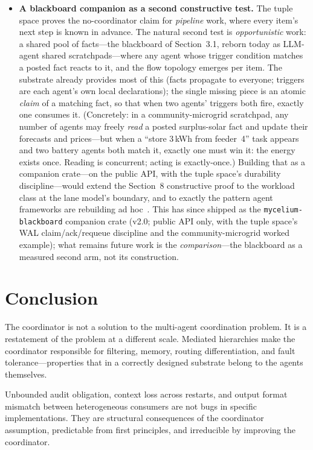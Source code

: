 \documentclass[11pt]{article}
\begin{document}
\begin{itemize}
\item \textbf{A blackboard companion as a second constructive test.} The
  tuple space proves the no-coordinator claim for \emph{pipeline} work, where
  every item's next step is known in advance. The natural second test is
  \emph{opportunistic} work: a shared pool of facts---the blackboard of
  Section~3.1, reborn today as LLM-agent shared scratchpads---where any agent
  whose trigger condition matches a posted fact reacts to it, and the flow
  topology emerges per item. The substrate already provides most of this
  (facts propagate to everyone; triggers are each agent's own local
  declarations); the single missing piece is an atomic \emph{claim} of a
  matching fact, so that when two agents' triggers both fire, exactly one
  consumes it. (Concretely: in a community-microgrid scratchpad, any number of
  agents may freely \emph{read} a posted surplus-solar fact and update their
  forecasts and prices---but when a ``store 3\,kWh from feeder~4'' task
  appears and two battery agents both match it, exactly one must win it: the
  energy exists once. Reading is concurrent; acting is exactly-once.) Building that as a companion crate---on the public API, with
  the tuple space's durability discipline---would extend the Section~8
  constructive proof to the workload class at the lane model's boundary, and
  to exactly the pattern agent frameworks are rebuilding ad
  hoc~\cite{carvalho}. This has since shipped as the \texttt{mycelium-blackboard}
  companion crate (v2.0; public API only, with the tuple space's WAL
  claim/ack/requeue discipline and the community-microgrid worked example);
  what remains future work is the \emph{comparison}---the blackboard as a
  measured second arm, not its construction.
\end{itemize}

\section{Conclusion}

The coordinator is not a solution to the multi-agent coordination problem. It is a
restatement of the problem at a different scale. Mediated hierarchies make the
coordinator responsible for filtering, memory, routing differentiation, and fault
tolerance---properties that in a correctly designed substrate belong to the agents
themselves.

Unbounded audit obligation, context loss across restarts, and output format
mismatch between heterogeneous consumers are not bugs in specific implementations.
They are structural consequences of the coordinator assumption, predictable from
first principles, and irreducible by improving the coordinator.
\end{document}
